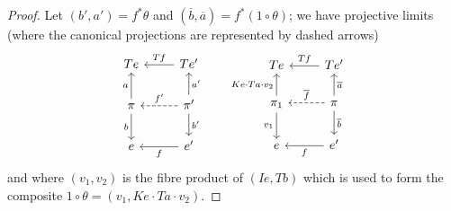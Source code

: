 \documentclass[fleqn]{article}
\newcommand{\oldpage}[1]{\marginpar{\footnotesize$\Big\vert$ \textit{p.~#1}}}
\begin{document}
\begin{proof}
  Let $(b',a')=f^*\theta$ and $(\overline{b},\overline{a})=f^*(1\circ\theta)$;
  we have projective limits (where the canonical projections are represented by dashed arrows)
  \[
    \begin{tikzcd}
      Te
    & Te'
        \ar[l,swap,"Tf"]
    \\\pi
        \ar[u,"a"]
        \ar[d,swap,"b"]
    & \pi'
        \ar[u,swap,"a'"]
        \ar[d,"b'"]
        \ar[l,dashed,swap,"f'"]
    \\e
    & e'
        \ar[l,"f"]
    \end{tikzcd}
    \qquad
    \begin{tikzcd}
      Te
    & Te'
        \ar[l,swap,"Tf"]
    \\\pi_1
        \ar[u,"Ke\cdot Ta\cdot v_2"]
        \ar[d,swap,"v_1"]
    & \pi
        \ar[u,swap,"\overline{a}"]
        \ar[d,"\overline{b}"]
        \ar[l,dashed,swap,"\overline{f}"]
    \\e
    & e'
        \ar[l,"f"]
    \end{tikzcd}
  \]
  \oldpage{264}
  and where $(v_1,v_2)$ is the fibre product of $(Ie,Tb)$ which is used to form the composite $1\circ\theta=(v_1,Ke\cdot Ta\cdot v_2)$.


\end{proof}
\end{document}
